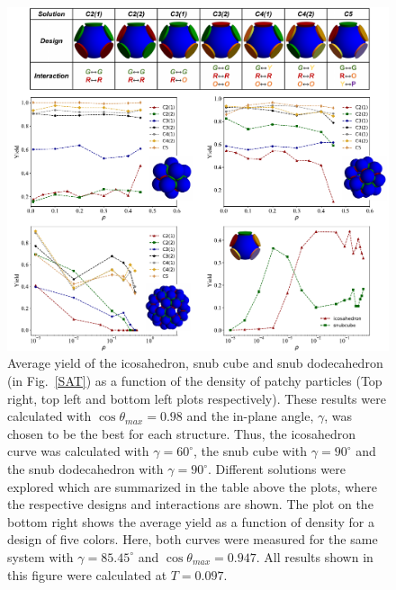 \documentclass[a4paper, amsfonts, amssymb, amsmath, reprint, showkeys, nofootinbib, twoside]{revtex4-1}
\begin{document}
\begin{figure}[t]
	\includegraphics{fig4.pdf}
	\caption{\label{Yield} Average yield of the icosahedron, snub cube and snub dodecahedron (in Fig.~\ref{SAT}) as a function of the density of patchy particles (Top right, top left and bottom left plots respectively). These results were calculated with $\cos\theta_{max}=0.98$ and the in-plane angle, $\gamma$, was chosen to be the best for each structure. Thus, the icosahedron curve was calculated with $\gamma=60^\circ$, the snub cube with $\gamma=90^\circ$ and the snub dodecahedron with $\gamma=90^\circ$. Different solutions were explored which are summarized in the table above the plots, where the respective designs and interactions are shown. The plot on the bottom right shows the average yield as a function of density for a design of five colors. Here, both curves were measured for the same system with $\gamma=85.45^\circ$ and $\cos\theta_{max}=0.947$. All results shown in this figure were calculated at $T=0.097$.}
\end{figure}
\end{document}
